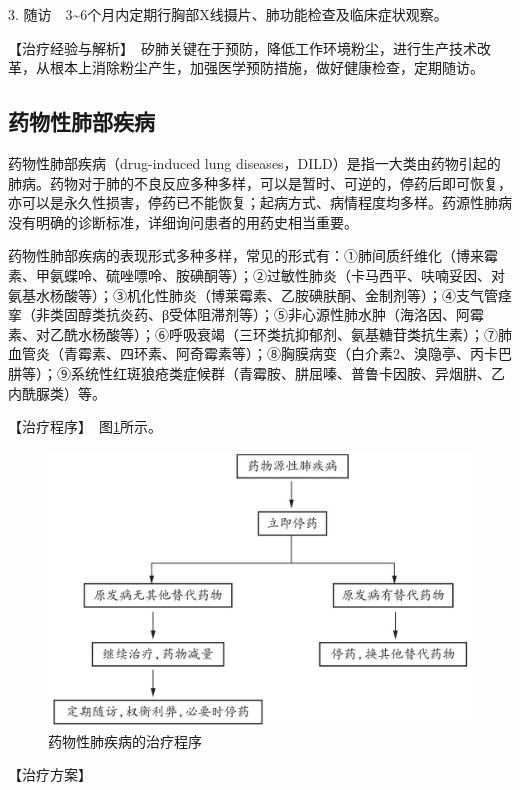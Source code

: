 3.
随访　3\textasciitilde{}6个月内定期行胸部X线摄片、肺功能检查及临床症状观察。

【治疗经验与解析】　矽肺关键在于预防，降低工作环境粉尘，进行生产技术改革，从根本上消除粉尘产生，加强医学预防措施，做好健康检查，定期随访。

\subsection{药物性肺部疾病}

药物性肺部疾病（drug-induced lung
diseases，DILD）是指一大类由药物引起的肺病。药物对于肺的不良反应多种多样，可以是暂时、可逆的，停药后即可恢复，亦可以是永久性损害，停药已不能恢复；起病方式、病情程度均多样。药源性肺病没有明确的诊断标准，详细询问患者的用药史相当重要。

药物性肺部疾病的表现形式多种多样，常见的形式有：①肺间质纤维化（博来霉素、甲氨蝶呤、硫唑嘌呤、胺碘酮等）；②过敏性肺炎（卡马西平、呋喃妥因、对氨基水杨酸等）；③机化性肺炎（博莱霉素、乙胺碘肤酮、金制剂等）；④支气管痉挛（非类固醇类抗炎药、β受体阻滞剂等）；⑤非心源性肺水肿（海洛因、阿霉素、对乙酰水杨酸等）；⑥呼吸衰竭（三环类抗抑郁剂、氨基糖苷类抗生素）；⑦肺血管炎（青霉素、四环素、阿奇霉素等）；⑧胸膜病变（白介素2、溴隐亭、丙卡巴肼等）；⑨系统性红斑狼疮类症候群（青霉胺、肼屈嗪、普鲁卡因胺、异烟肼、乙内酰脲类）等。

【治疗程序】　图\ref{fig1-14-8}所示。

\begin{figure}[!htbp]
 \centering
 \includegraphics{./images/Image00036.jpg}
 \captionsetup{justification=centering}
 \caption{药物性肺疾病的治疗程序}
 \label{fig1-14-8}
  \end{figure} 

【治疗方案】

